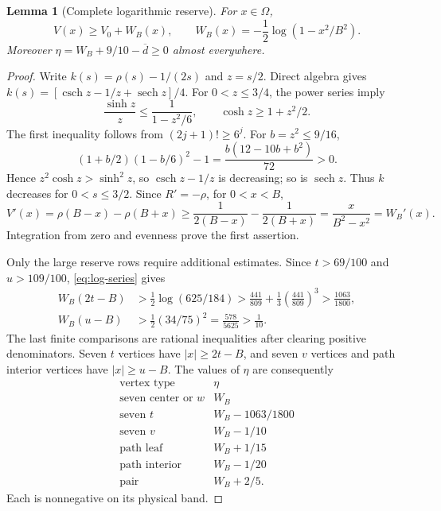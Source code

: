 \documentclass[11pt,a4paper]{article}
\newcommand{\dbar}{\overline d}
\newtheorem{lemma}[theorem]{Lemma}
\theoremstyle{remark}
\numberwithin{equation}{section}
\begin{document}
\begin{lemma}[Complete logarithmic reserve]\label{lem:log-reserve}
For $x\in\Omega$,
\[
 V(x)\ge V_0+W_B(x),\qquad
 W_B(x)=-\frac12\log(1-x^2/B^2).
\]
Moreover $\eta=W_B+9/10-\dbar\ge0$ almost everywhere.
\end{lemma}
\begin{proof}
Write $k(s)=\rho(s)-1/(2s)$ and $z=s/2$. Direct algebra gives
$k(s)=[\operatorname{csch}z-1/z+\operatorname{sech}z]/4$.
For $0<z\le3/4$, the power series imply
\[
 \frac{\sinh z}{z}\le\frac1{1-z^2/6},\qquad
 \cosh z\ge1+z^2/2.
\]
The first inequality follows from $(2j+1)!\ge6^j$. For $b=z^2\le9/16$,
\[
 (1+b/2)(1-b/6)^2-1=\frac{b(12-10b+b^2)}{72}>0.
\]
Hence $z^2\cosh z>\sinh^2z$, so
$\operatorname{csch}z-1/z$ is decreasing; so is $\operatorname{sech}z$.
Thus $k$ decreases for $0<s\le3/2$. Since $R'=-\rho$, for $0<x<B$,
\[
 V'(x)=\rho(B-x)-\rho(B+x)
 \ge\frac1{2(B-x)}-\frac1{2(B+x)}
 =\frac{x}{B^2-x^2}=W_B'(x).
\]
Integration from zero and evenness prove the first assertion.

Only the large reserve rows require additional estimates. Since
$t>69/100$ and $u>109/100$, \eqref{eq:log-series} gives
\begin{align*}
 W_B(2t-B)&>\tfrac12\log(625/184)
 >\frac{441}{809}+\frac13\left(\frac{441}{809}\right)^3
 >\frac{1063}{1800},\\
 W_B(u-B)&>\tfrac12(34/75)^2=\frac{578}{5625}>\frac1{10}.
\end{align*}
The last finite comparisons are rational inequalities after clearing
positive denominators. Seven $t$ vertices have $|x|\ge2t-B$, and seven
$v$ vertices and path interior vertices have $|x|\ge u-B$.
The values of $\eta$ are consequently
\[
\begin{array}{c|c}
\text{vertex type}&\eta\\\hline
\text{seven center or }w&W_B\\
\text{seven }t&W_B-1063/1800\\
\text{seven }v&W_B-1/10\\
\text{path leaf}&W_B+1/15\\
\text{path interior}&W_B-1/20\\
\text{pair}&W_B+2/5.
\end{array}
\]
Each is nonnegative on its physical band.
\end{proof}
\end{document}
